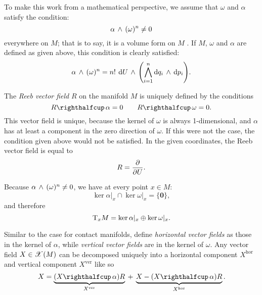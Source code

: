 To make this work from a mathematical perspective, we assume that $\omega$ and $\alpha$ satisfy the condition:
$$  \alpha\,\wedge\,(\omega)^n  \neq 0$$
everywhere on $M$; that is to say, it is a volume form on $M$ \cite{ciaglia2018}. If $M$, $\omega$ and $\alpha$ are defined as given above, this condition is clearly satisfied:
$$  \alpha\,\wedge\,(\omega)^n  = n!\: \dd{U}\,\wedge\,\qty(\bigwedge_{i=1}^{n} \dd{q_i}\,\wedge\,\dd{p_i} ) . $$

The \emph{Reeb vector field} $R$ on the manifold $M$ is uniquely defined by the conditions
$$ \intpr{R}{\alpha} = 0 \qquad \intpr{R}{\omega} = 0. $$
This vector field is unique, because the kernel of $\omega$ is always 1-dimensional, and $\alpha$ has at least a component in the zero direction of $\omega$. If this were not the case, the condition given above would not be satisfied. In the given coordinates, the Reeb vector field is equal to
$$ R = \pdv{}{U}. $$

Because $  \alpha\,\wedge\,(\omega)^n  \neq 0$, we have at every point $x \in M$:
$$ \ker{\alpha}\vert_x \cap \ker{\omega}\vert_x = \{\mathbf{0}\}, $$
and therefore \cite{dazord1991}
$$ \mathrm{T}_{x} M = \ker{\alpha} \vert_x \oplus \ker{\omega}\vert_x. $$

Similar to the case for contact manifolds, define \emph{horizontal vector fields} as those in the kernel of $\alpha$, while \emph{vertical vector fields} are in the kernel of $\omega$. Any vector field $ X \in \mathscr{X}\qty(M)$ can be decomposed uniquely into a horizontal component $X^\text{hor}$ and vertical component $X^\text{ver}$ like so
$$ X = \underbrace{\qty(\intpr{X}{\alpha})R}_{X^\text{ver}}\: + \: \underbrace{X - (\intpr{X}{\alpha})R}_{X^\text{hor}}. $$


